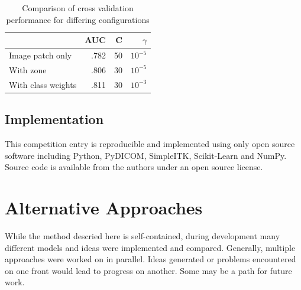 \documentclass[a4paper]{spie}
\begin{document}
\begin{table}
  \caption{Comparison of cross validation performance for differing configurations}
  \label{table:performance}

  \begin{center}
  \begin{tabular}{ l | r | r | r }
    & AUC  & C  & $\gamma$ \\
    \hline
    Image patch only    & .782 & 50 & $10^{-5}$  \\
    With zone           & .806 & 30 & $10^{-5}$  \\
    With class weights  & .811 & 30 & $10^{-3}$  \\
  \end{tabular}
  \end{center}
\end{table}

\subsection{Implementation}

This competition entry is reproducible and implemented using only open source software including Python, PyDICOM, SimpleITK\cite{simpleitk}, Scikit-Learn\cite{scikit-learn} and NumPy\cite{numpy}. Source code is available from the authors under an open source license.

\section{Alternative Approaches}

While the method descried here is self-contained, during development many different models and ideas were implemented and compared. Generally, multiple approaches were worked on in parallel. Ideas generated or problems encountered on one front would lead to progress on another. Some may be a path for future work.
\end{document}
